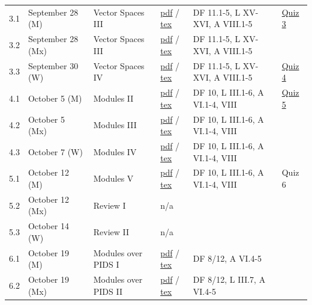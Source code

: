 \documentclass[11pt,letterpaper]{article}
\begin{document}
\begin{longtable}{L{25pt}L{86pt}L{104pt}L{54pt}L{137pt}L{50pt}}
3.1 & September 28 (M) & Vector Spaces III & \href{https://www.juliettebruce.xyz/teaching/101F26/3-1.pdf}{pdf} / \href{https://www.juliettebruce.xyz/teaching/101F26/3-1.tex}{tex} & DF 11.1-5, L XV-XVI, A VIII.1-5 & \href{https://www.juliettebruce.xyz/teaching/101F26/Quiz3.pdf}{Quiz 3} \\
3.2 & September 28 (Mx) & Vector Spaces III & \href{https://www.juliettebruce.xyz/teaching/101F26/3-2.pdf}{pdf} / \href{https://www.juliettebruce.xyz/teaching/101F26/3-2.tex}{tex} & DF 11.1-5, L XV-XVI, A VIII.1-5 &  \\
3.3 & September 30 (W) & Vector Spaces IV & \href{https://www.juliettebruce.xyz/teaching/101F26/3-3.pdf}{pdf} / \href{https://www.juliettebruce.xyz/teaching/101F26/3-3.tex}{tex} & DF 11.1-5, L XV-XVI, A VIII.1-5 & \href{https://www.juliettebruce.xyz/teaching/101F26/Quiz4.pdf}{Quiz 4} \\
4.1 & October 5 (M) & Modules II & \href{https://www.juliettebruce.xyz/teaching/101F26/4-1.pdf}{pdf} / \href{https://www.juliettebruce.xyz/teaching/101F26/4-1.tex}{tex} & DF 10, L III.1-6, A VI.1-4, VIII & \href{https://www.juliettebruce.xyz/teaching/101F26/Quiz5.pdf}{Quiz 5} \\
4.2 & October 5 (Mx) & Modules III & \href{https://www.juliettebruce.xyz/teaching/101F26/4-2.pdf}{pdf} / \href{https://www.juliettebruce.xyz/teaching/101F26/4-2.tex}{tex} & DF 10, L III.1-6, A VI.1-4, VIII &  \\
4.3 & October 7 (W) & Modules IV & \href{https://www.juliettebruce.xyz/teaching/101F26/4-3.pdf}{pdf} / \href{https://www.juliettebruce.xyz/teaching/101F26/4-3.tex}{tex} & DF 10, L III.1-6, A VI.1-4, VIII &  \\
5.1 & October 12 (M) & Modules V & \href{https://www.juliettebruce.xyz/teaching/101F26/4-3.pdf}{pdf} / \href{https://www.juliettebruce.xyz/teaching/101F26/4-3.tex}{tex} & DF 10, L III.1-6, A VI.1-4, VIII & Quiz 6 \\
5.2 & October 12 (Mx) & Review I & n/a &  &  \\
5.3 & October 14 (W) & Review II & n/a &  &  \\
6.1 & October 19 (M) & Modules over PIDS I & \href{https://www.juliettebruce.xyz/teaching/101F26/6-1.pdf}{pdf} / \href{https://www.juliettebruce.xyz/teaching/101F26/6-1.tex}{tex} & DF 8/12, A VI.4-5 &  \\
6.2 & October 19 (Mx) & Modules over PIDS II & \href{https://www.juliettebruce.xyz/teaching/101F26/6-1.pdf}{pdf} / \href{https://www.juliettebruce.xyz/teaching/101F26/6-1.tex}{tex} & DF 8/12, L III.7, A VI.4-5 &  \\

\end{longtable}
\end{document}
